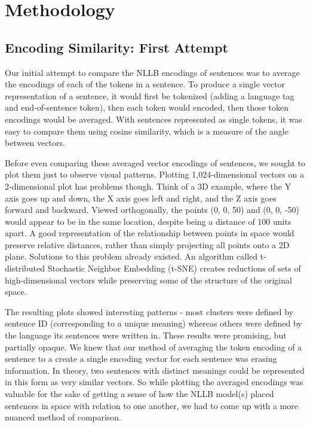\chapter{Methodology}
\label{chap:methodology}

\section{Encoding Similarity: First Attempt}

Our initial attempt to compare the NLLB encodings of sentences was to average the encodings of each of the tokens in a sentence. To produce a single vector representation of a sentence, it would first be tokenized (adding a language tag and end-of-sentence token), then each token would encoded, then those token encodings would be averaged. With sentences represented as single tokens, it was easy to compare them using cosine similarity, which is a measure of the angle between vectors. 

Before even comparing these averaged vector encodings of sentences, we sought to plot them just to observe visual patterns. Plotting 1,024-dimensional vectors on a 2-dimensional plot has problems though. Think of a 3D example, where the Y axis goes up and down, the X axis goes left and right, and the Z axis goes forward and backward. Viewed orthogonally, the points (0, 0, 50) and (0, 0, -50) would appear to be in the same location, despite being a distance of 100 units apart. A good representation of the relationship between points in space would preserve relative distances, rather than simply projecting all points onto a 2D plane. Solutions to this problem already existed. An algorithm called t-distributed Stochastic Neighbor Embedding (t-SNE)\cite{van2008visualizing} creates reductions of sets of high-dimensional vectors while preserving some of the structure of the original space. 

The resulting plots showed interesting patterns - most clusters were defined by sentence ID (corresponding to a unique meaning) whereas others were defined by the language its sentences were written in. These results were promising, but partially opaque. We knew that our method of averaging the token encoding of a sentence to a create a single encoding vector for each sentence was erasing information. In theory, two sentences with distinct meanings could be represented in this form as very similar vectors. So while plotting the averaged encodings was valuable for the sake of getting a sense of how the NLLB model(s) placed sentences in space with relation to one another, we had to come up with a more nuanced method of comparison. 

